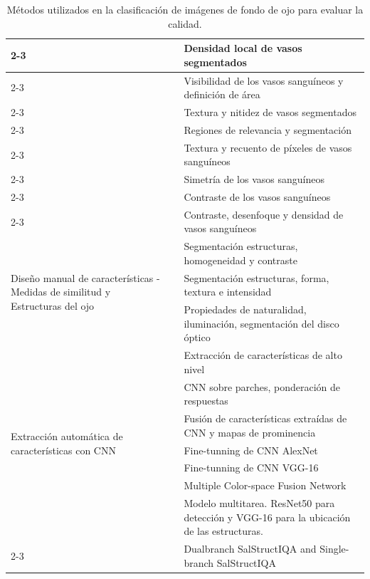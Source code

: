 \begin{table}[ht]
{\begin{tabular}{|p{4cm}|l|l|}
		\cline{2-3}
		& \parencites{giancardo2010} & Densidad local de vasos segmentados \\
		\cline{2-3}
		& \parencites{hunter2011visibility} & Visibilidad de los vasos sanguíneos y definición de área \\
		\cline{2-3}
		& \parencites{yu2012texture} & Textura y nitidez de vasos segmentados \\
		\cline{2-3}
		& \parencites{fleming2012automated} & Regiones de relevancia y segmentación \\
		\cline{2-3}
		& \parencites{koehler2013automatic} & Textura y recuento de píxeles de vasos sanguíneos \\
		\cline{2-3}
		& \parencites{katuwal2013automatic} & Simetría de los vasos sanguíneos \\
		\cline{2-3}
		& \parencites{nugroho2014contrast} & Contraste de los vasos sanguíneos \\
		\cline{2-3}
		& \parencites{yin2014automatic} & Contraste, desenfoque y densidad de vasos sanguíneos \\
		\hline
		\multirow{3}{*}{\parbox[t]{4cm}{Diseño manual de características - Medidas de similitud y Estructuras del ojo}} & \parencites{paulus2010automated} & Segmentación estructuras, homogeneidad y contraste \\
		\cline{2-3}
		& \parencites{sevik2014retinal} & Segmentación estructuras, forma, textura e intensidad \\
		\cline{2-3}
		& \parencites{shao2018naturalness} & Propiedades de naturalidad, iluminación, segmentación del disco óptico \\
		\hline
		\multirow{7}{*}{\parbox[t]{4cm}{Extracción automática de características con CNN}} & \parencites{mahapatra2016} & Extracción de características de alto nivel \\
		\cline{2-3}
		& \parencites{costa2017eyequal} & CNN sobre parches, ponderación de respuestas \\
		\cline{2-3}
		& \parencites{yu2017image} & Fusión de características extraídas de CNN y mapas de prominencia \\
		\cline{2-3}
		& \parencites{saha2018automated} & Fine-tunning de CNN AlexNet \\
		\cline{2-3}
		& \parencites{zago2018retinal} & Fine-tunning de CNN VGG-16 \\
		\cline{2-3}
		& \parencites{fu2019evaluation} & Multiple Color-space Fusion Network \\
		\cline{2-3}
		& \parencites{shen2018multi} & Modelo multitarea. ResNet50 para detección y VGG-16 para la ubicación de las estructuras. \\
		\cline{2-3}
		& \parencites{xu2020deep} & Dualbranch SalStructIQA and Single-branch SalStructIQA \\
		\hline
	\end{tabular}
	}
	\caption{Métodos utilizados en la clasificación de imágenes de fondo de ojo para evaluar la calidad.}
	\label{tab:metodosQA}
\end{table}


